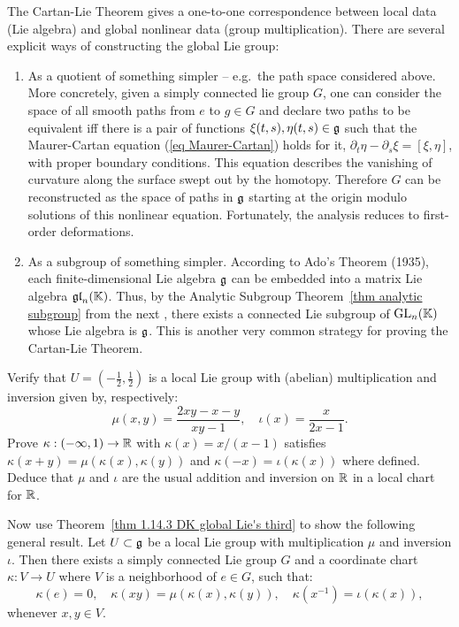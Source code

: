 \begin{rem}\label{rem Lie III}
    The Cartan-Lie Theorem gives a one-to-one correspondence between local data (Lie algebra) and global nonlinear data (group multiplication). There are several explicit ways of constructing the global Lie group:
    \begin{enumerate}
        \item As a quotient of something simpler -- e.g.\ the path space considered above. More concretely, given a simply connected lie group $G$, one can consider the space of all smooth paths from $e$ to $g\in G$ and declare two paths to be equivalent iff there is a pair of functions $\xi(t,s),\eta(t,s)\in\mathfrak{g}$ such that the Maurer-Cartan equation (\ref{eq Maurer-Cartan}) holds for it, $\partial_t\eta-\partial_s\xi=[\xi,\eta]$, with proper boundary conditions. This equation describes the vanishing of curvature along the surface swept out by the homotopy. Therefore $G$ can be reconstructed as the space of paths in $\mathfrak{g}$ starting at the origin modulo solutions of this nonlinear equation. Fortunately, the analysis reduces to first-order deformations.

        \item As a subgroup of something simpler. According to Ado's Theorem (1935), each finite-dimensional Lie algebra $\mathfrak{g}$ can be embedded into a matrix Lie algebra $\mathfrak{gl}_n(\mathbb{K})$. Thus, by the Analytic Subgroup Theorem\ \ref{thm analytic subgroup} from the next \subsect, there exists a connected Lie subgroup of $\operatorname{GL}_n(\mathbb{K})$ whose Lie algebra is $\mathfrak{g}$. This is another very common strategy for proving the Cartan-Lie Theorem.
    \end{enumerate}
\end{rem}


\begin{xca}
    Verify that $U=(-\frac12,\frac12)$ is a local Lie group with (abelian) multiplication and inversion given by, respectively:
    \[\mu(x,y)=\frac{2xy-x-y}{xy-1},\quad \iota(x)=\frac{x}{2x-1}.\]
    Prove $\kappa:(-\infty,1)\to \mathbb{R}$ with $\kappa(x)=x/(x-1)$ satisfies $\kappa(x+y)=\mu(\kappa(x),\kappa(y))$ and $\kappa(-x)=\iota(\kappa(x))$ where defined. Deduce that $\mu$ and $\iota$ are the usual addition and inversion on $\mathbb{R}$ in a local chart for $\mathbb{R}$. 

    Now use Theorem~\ref{thm 1.14.3 DK global Lie's third} to show the following general result. Let $U\subset \mathfrak{g}$ be a local Lie group with multiplication $\mu$ and inversion $\iota$. Then there exists a simply connected Lie group $G$ and a coordinate chart $\kappa:V\to U$ where $V$ is a neighborhood of $e\in G$, such that:
    \[\kappa(e)=0,\quad \kappa(xy)=\mu(\kappa(x),\kappa(y)),\quad\kappa(x^{-1})=\iota(\kappa(x)),\]
    whenever $x,y\in V$.
\end{xca}






